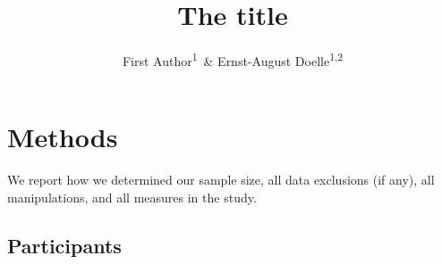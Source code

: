 \documentclass[,man]{apa6}
\title{The title}
\author{First Author\textsuperscript{1}~\& Ernst-August
Doelle\textsuperscript{1,2}}
\date{}
\affiliation{
\vspace{0.5cm}
\textsuperscript{1} Wilhelm-Wundt-University\\\textsuperscript{2} Konstanz Business School}
\begin{document}
\maketitle

\hypertarget{methods}{%
\section{Methods}\label{methods}}

We report how we determined our sample size, all data exclusions (if
any), all manipulations, and all measures in the study.

\hypertarget{participants}{%
\subsection{Participants}\label{participants}}

\begingroup\fontsize{7}{9}\selectfont
\end{document}
